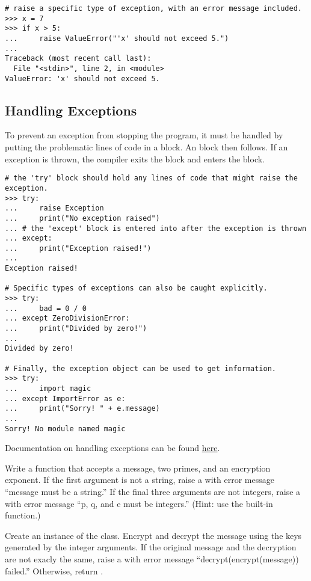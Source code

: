 \begin{lstlisting}
# raise a specific type of exception, with an error message included.
>>> x = 7
>>> if x > 5:
...     raise ValueError("'x' should not exceed 5.")
... 
Traceback (most recent call last):
  File "<stdin>", line 2, in <module>
ValueError: 'x' should not exceed 5.
\end{lstlisting}

\subsection*{Handling Exceptions}

To prevent an exception from stopping the program, it must be handled by
putting the problematic lines of code in a  block.
An  block then follows.
If an exception is thrown, the compiler exits the  block and enters the  block.

\begin{lstlisting}
# the 'try' block should hold any lines of code that might raise the exception.
>>> try:
...     raise Exception
...     print("No exception raised")
... # the 'except' block is entered into after the exception is thrown
... except:
...     print("Exception raised!")
... 
Exception raised!

# Specific types of exceptions can also be caught explicitly.
>>> try:
...     bad = 0 / 0
... except ZeroDivisionError:
...     print("Divided by zero!")
... 
Divided by zero!

# Finally, the exception object can be used to get information.
>>> try:
...     import magic
... except ImportError as e:
...     print("Sorry! " + e.message)
... 
Sorry! No module named magic
\end{lstlisting}

Documentation on handling exceptions can be found \href{https://docs.python.org/2/tutorial/errors.html}{here}.

\begin{problem}
Write a  function that accepts a message, two primes, and an encryption exponent.
If the first argument is not a string, raise a  with error message ``message must be a string.''
If the final three arguments are not integers, raise a  with error message ``p, q, and e must be integers.''
(Hint: use the built-in  function.)

Create an instance of the  class.
Encrypt and decrypt the message using the keys generated by the integer arguments.
If the original message and the decryption are not exacly the same, raise a  with error message ``decrypt(encrypt(message)) failed.''
Otherwise, return .
\end{problem}

